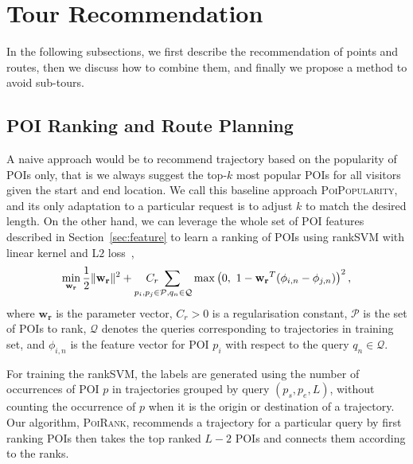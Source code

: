 
\section{Tour Recommendation}
\label{sec:recommendation}

In the following subsections, we first describe the recommendation of points and routes,
then we discuss how to combine them, and finally we propose a method to avoid sub-tours.

\subsection{POI Ranking and Route Planning}
\label{sec:rankplan}

A naive approach would be to recommend trajectory based on the popularity of POIs only,
that is we always suggest the top-$k$ most popular POIs for all visitors given the start and end location.
We call this baseline approach \textsc{PoiPopularity},
and its only adaptation to a particular request is to adjust $k$ to match the desired length.
%
On the other hand, we can leverage the whole set of POI features described in Section~\ref{sec:feature}
to learn a ranking of POIs using rankSVM with linear kernel and L$2$ loss~\cite{lranksvm},
\eqmoveup
\begin{equation*}
\eqmoveup
\min_{\mathbf{w_r}} \frac{1}{2}
                     \|\mathbf{w_r}\|^2 +
                    \underset{p_i, p_j \in \mathcal{P}, q_n \in \mathcal{Q}}{C_r ~\sum}
                    \max \left( 0,~ 1 - \mathbf{w_r}^T (\phi_{i,n} - \phi_{j,n}) \right)^2,
\end{equation*}
where $\mathbf{w_r}$ is the parameter vector,
$C_r > 0$ is a regularisation constant,
$\mathcal{P}$ is the set of POIs to rank,
$\mathcal{Q}$ denotes the queries corresponding to trajectories in training set,
and $\phi_{i,n}$ is the feature vector for POI $p_i$ with respect to the query $q_n \in \mathcal{Q}$.

For training the rankSVM, the labels are generated using the number of occurrences of
POI $p$ in trajectories grouped by query $(p_s, p_e, L)$,
without counting the occurrence of $p$ when it is the origin or destination of a trajectory.
Our algorithm, \textsc{PoiRank}, recommends a trajectory for a particular query
by first ranking POIs
then takes the top ranked $L-2$ POIs and connects them according to the ranks.



